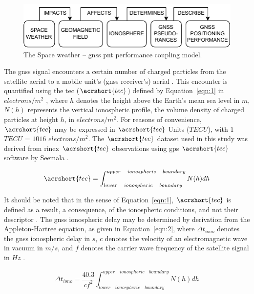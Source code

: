 \let\LaTeXcline\cline\documentclass[sn-mathphys-num]{sn-jnl}\let\cline\LaTeXcline
\begin{document}
\begin{figure}[!ht]
 \centering
 \includegraphics[width=0.89\linewidth]{SpaceWeather-TwoLines.drawio.pdf}
    \caption{The Space weather – \acrshort{gnss} \acrshort{pnt} performance coupling model.}
    \label{fig:SpaceWeather}
\end{figure}

The \acrshort{gnss} signal encounters a certain number of charged particles from the satellite aerial to a mobile unit’s (\acrshort{gnss} receiver’s) aerial \cite{schaer1999mapping, prolss2012physics}. This encounter is quantified using the \acrlong{tec} ($\acrshort{tec}$) defined by Equation~\ref{eqn:1} in $electrons/m^{2}$ \cite{spilker1996global, schaer1999mapping, davies1990ionospheric}, where $h$ denotes the height above the Earth’s mean sea level in $m$, $N(h)$ represents the vertical ionospheric profile, the volume density of charged particles at height $h$, in $electrons/m^{2}$. For reasons of convenience, $\acrshort{tec}$ may be expressed in $\acrshort{tec}$ Units ($TECU$), with $1$ $TECU$ = $1016$ $electrons/m^{2}$. The $\acrshort{tec}$ dataset used in this study was derived from \acrfull{rinex} $\acrshort{tec}$ observations using \acrfull{gps} $\acrshort{tec}$ software by Seemala \cite{SEEMALA202363}.

\begin{equation}
	\acrshort{tec} = \int_{lower \quad ionospheric \quad boundary}^{upper \quad ionospheric \quad boundary}N(h)dh
	\label{eqn:1}
\end{equation}

It should be noted that in the sense of Equation~\ref{eqn:1}, $\acrshort{tec}$ is defined as a result, a consequence, of the ionospheric conditions, and not their descriptor \cite{spilker1996global}. The \acrshort{gnss} ionospheric delay may be determined by derivation from the Appleton-Hartree equation, as given in Equation~\ref{eqn:2}, where $\Delta t_{iono}$ denotes the \acrshort{gnss} ionospheric delay in $s$, $c$ denotes the velocity of an electromagnetic wave in vacuum in $m/s$, and $f$ denotes the carrier wave frequency of the satellite signal in $Hz$ \cite{spilker1996global, schaer1999mapping}.

\begin{equation}
	\Delta t_{iono} = \frac{40.3}{c f^{2}} \int_{lower \quad ionospheric \quad boundary}^{upper \quad ionospheric \quad boundary}N(h)dh
	\label{eqn:2}
\end{equation}
\end{document}
